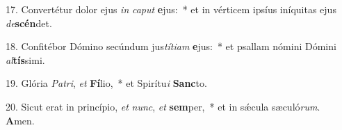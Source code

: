 17. Convertétur dolor ejus \textit{in} \textit{ca}\textit{put} \textbf{e}jus:~*  et in vérticem ipsíus iníquitas ejus \textit{de}\textbf{scén}det.\

18. Confitébor Dómino secúndum jus\textit{tí}\textit{ti}\textit{am} \textbf{e}jus:~*  et psallam nómini Dómini \textit{al}\textbf{tís}simi.\

19. Glória \textit{Pa}\textit{tri}, \textit{et} \textbf{Fí}lio,~*  et Spirítu\textit{i} \textbf{Sanc}to.\

20. Sicut erat in princípio, \textit{et} \textit{nunc}, \textit{et} \textbf{sem}per,~*  et in sǽcula sæculó\textit{rum}. \textbf{A}men.\

